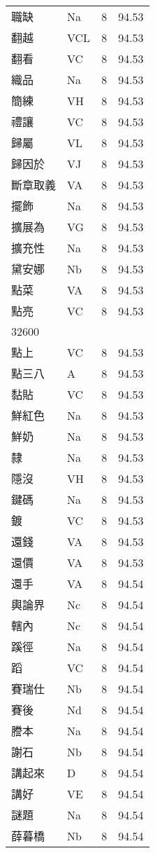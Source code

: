 \documentclass[twocolumn]{book}
\begin{document}
\begin{supertabular}{llrr}
職缺 & Na & 8 &  94.53\\
翻越 & VCL & 8 &  94.53\\
翻看 & VC & 8 &  94.53\\
織品 & Na & 8 &  94.53\\
簡練 & VH & 8 &  94.53\\
禮讓 & VC & 8 &  94.53\\
歸屬 & VL & 8 &  94.53\\
歸因於 & VJ & 8 &  94.53\\
斷章取義 & VA & 8 &  94.53\\
擺飾 & Na & 8 &  94.53\\
擴展為 & VG & 8 &  94.53\\
擴充性 & Na & 8 &  94.53\\
黛安娜 & Nb & 8 &  94.53\\
點菜 & VA & 8 &  94.53\\
點亮 & VC & 8 &  94.53\\
32600\\
點上 & VC & 8 &  94.53\\
點三八 & A & 8 &  94.53\\
黏貼 & VC & 8 &  94.53\\
鮮紅色 & Na & 8 &  94.53\\
鮮奶 & Na & 8 &  94.53\\
隸 & Na & 8 &  94.53\\
隱沒 & VH & 8 &  94.53\\
鍵碼 & Na & 8 &  94.53\\
鍍 & VC & 8 &  94.53\\
還錢 & VA & 8 &  94.53\\
還價 & VA & 8 &  94.53\\
還手 & VA & 8 &  94.54\\
輿論界 & Nc & 8 &  94.54\\
轄內 & Nc & 8 &  94.54\\
蹊徑 & Na & 8 &  94.54\\
蹈 & VC & 8 &  94.54\\
賽瑞仕 & Nb & 8 &  94.54\\
賽後 & Nd & 8 &  94.54\\
謄本 & Na & 8 &  94.54\\
謝石 & Nb & 8 &  94.54\\
講起來 & D & 8 &  94.54\\
講好 & VE & 8 &  94.54\\
謎題 & Na & 8 &  94.54\\
薛暮橋 & Nb & 8 &  94.54\\

\end{supertabular}
\end{document}
